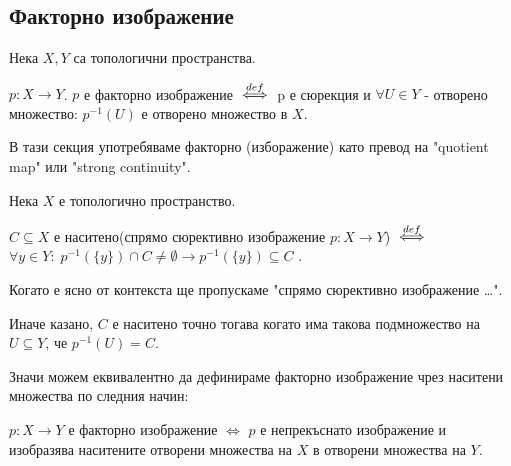 \subsection{Факторно изображение}
\begin{definition}
    Нека $X, Y$ са топологични пространства.
    
    $p: X \to Y$. $p$ е факторно изображение ${\overset{def}{\iff}}$ p е сюрекция и $\forall U \in Y$ - отворено множество: $p^{-1}(U)$ е отворено множество в $X$.
\end{definition}
\begin{notation}
    В тази секция употребяваме факторно (изборажение) като превод на "quotient map" или "strong continuity".
\end{notation}
\begin{definition}
    Нека $X$ е топологично пространство.
    
    $C \subseteq X$ е наситено(спрямо сюрективно изображение $p: X\to Y$) ${\overset{def}{\iff}}$ $\forall y \in Y:\; p^{-1}(\{y\}) \cap C \neq \emptyset \rightarrow p^{-1}(\{y\}) \subseteq C$  .
\end{definition}
\begin{notation}
    Когато е ясно от контекста ще пропускаме "спрямо сюрективно изображение \dots".
\end{notation}
Иначе казано, $C$ е наситено точно тогава когато има такова подмножество на $U \subseteq Y$, че $p^{-1}(U) = C$.

Значи можем еквивалентно да дефинираме факторно изображение чрез наситени множества по следния начин:
\begin{proposition}
    $p: X \to Y$ е факторно изображение $\iff$ $p$ е непрекъснато изображение и изобразява наситените отворени множества на $X$ в отворени множества на $Y$.
\end{proposition}

